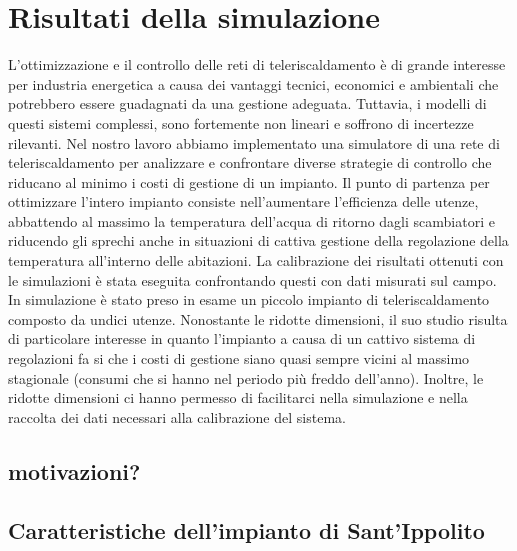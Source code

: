 \documentclass[laurea,oneside,11pt]{USiena_tesiLM}
\begin{document}
\chapter{Risultati della simulazione}
L'ottimizzazione e il controllo delle reti di teleriscaldamento è di grande interesse per industria energetica a causa dei vantaggi tecnici, economici e ambientali che potrebbero essere guadagnati da una gestione adeguata. Tuttavia, i modelli di questi sistemi complessi, sono fortemente non lineari  e soffrono di incertezze rilevanti. Nel nostro lavoro abbiamo implementato una simulatore di una rete di teleriscaldamento per analizzare e confrontare diverse strategie di controllo che riducano al minimo i costi di gestione di un impianto.
Il punto di partenza per ottimizzare l'intero impianto consiste   
nell'aumentare l'efficienza delle utenze, abbattendo al massimo la temperatura dell'acqua di ritorno dagli scambiatori e riducendo gli sprechi anche in situazioni di cattiva gestione della regolazione della temperatura all'interno delle abitazioni.  
La calibrazione dei risultati ottenuti con le simulazioni è stata eseguita confrontando questi con dati misurati sul campo.
In simulazione è stato preso in esame un piccolo impianto di teleriscaldamento composto da undici utenze. Nonostante le ridotte dimensioni, il suo studio risulta di particolare interesse in quanto l'impianto a causa di un cattivo sistema di regolazioni fa si che i costi di gestione siano quasi sempre vicini al massimo stagionale (consumi che si hanno nel periodo più freddo dell'anno). Inoltre, le ridotte dimensioni ci hanno permesso di facilitarci nella simulazione e nella raccolta dei dati necessari alla calibrazione del sistema.  

\section{motivazioni?}

\section{Caratteristiche dell'impianto di Sant'Ippolito}
\end{document}
